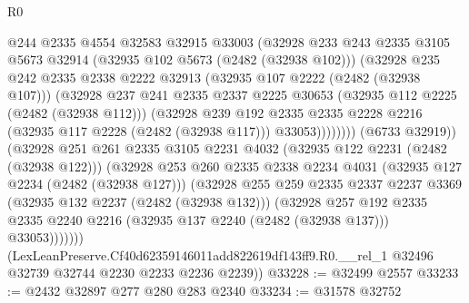 \begin{lexlean}{R0}
\begin{coremodule}
                      @244
                      @2335
                      @4554
                      @32583
                      @32915
                      @33003
                      (@32928
                        @233
                        @243
                        @2335
                        @3105
                        @5673
                        @32914
                        (@32935 @102 @5673 (@2482 (@32938 @102)))
                        (@32928
                          @235
                          @242
                          @2335
                          @2338
                          @2222
                          @32913
                          (@32935 @107 @2222 (@2482 (@32938 @107)))
                          (@32928
                            @237
                            @241
                            @2335
                            @2337
                            @2225
                            @30653
                            (@32935 @112 @2225 (@2482 (@32938 @112)))
                            (@32928
                              @239
                              @192
                              @2335
                              @2335
                              @2228
                              @2216
                              (@32935 @117 @2228 (@2482 (@32938 @117)))
                              @33053))))))))
              (@6733 @32919))
            (@32928
              @251
              @261
              @2335
              @3105
              @2231
              @4032
              (@32935 @122 @2231 (@2482 (@32938 @122)))
              (@32928
                @253
                @260
                @2335
                @2338
                @2234
                @4031
                (@32935 @127 @2234 (@2482 (@32938 @127)))
                (@32928
                  @255
                  @259
                  @2335
                  @2337
                  @2237
                  @3369
                  (@32935 @132 @2237 (@2482 (@32938 @132)))
                  (@32928
                    @257
                    @192
                    @2335
                    @2335
                    @2240
                    @2216
                    (@32935 @137 @2240 (@2482 (@32938 @137)))
                    @33053)))))))
      (LexLeanPreserve.Cf40d62359146011add822619df143ff9.R0.__rel_1
        @32496
        @32739
        @32744
        @2230
        @2233
        @2236
        @2239))
@33228 := @32499 @2557
@33233 := @2432 @32897 @277 @280 @283 @2340
@33234 := @31578 @32752

\end{coremodule}
\end{lexlean}
